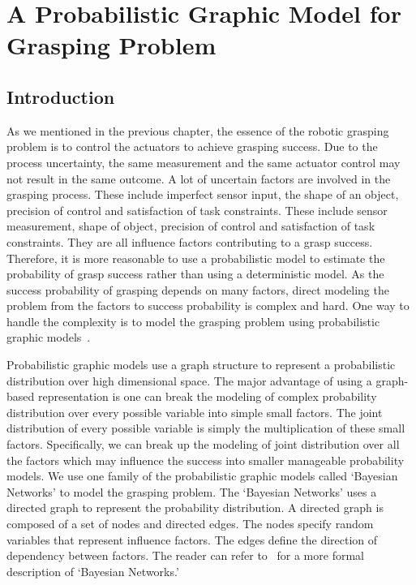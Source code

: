 \chapter{A Probabilistic Graphic Model for Grasping Problem}
\label{chapter2}
\section{Introduction}
As we mentioned in the previous chapter, the essence of the robotic grasping problem is to control the actuators to achieve grasping success. Due to the process uncertainty, the same measurement and the same actuator control may not result in the same outcome.  A lot of uncertain factors are involved in the grasping process. These include imperfect sensor input, the shape of an object, precision of control and satisfaction of task constraints.  These include sensor measurement, shape of object, precision of control and satisfaction of task constraints. They are all influence factors contributing to a grasp success. Therefore, it is more reasonable to use a probabilistic model to estimate the probability of grasp success rather than using a deterministic model. As the success probability of grasping depends on many factors, direct modeling the problem from the factors to success probability is complex and hard. One way to handle the complexity is to model the grasping problem using probabilistic graphic models~\cite{Koller1989}.  

Probabilistic graphic models use a graph structure to represent a probabilistic distribution over high dimensional space. The major advantage of using a graph-based representation is one can break the modeling of complex probability distribution over every possible variable into simple small factors. The joint distribution of every possible variable is simply the multiplication of these small factors. Specifically,  we can break up the modeling of joint distribution over all the factors which may influence the success into smaller manageable probability models.  We use one family of the probabilistic graphic models called `Bayesian Networks' to model the grasping problem. The `Bayesian Networks' uses a directed graph to represent    the probability distribution. A directed graph is composed of a set of nodes and directed edges. The nodes specify random variables that represent influence factors. The edges define the direction of dependency between factors. The reader can refer to~\cite{Korb2003} for a more formal description of  `Bayesian Networks.'  


